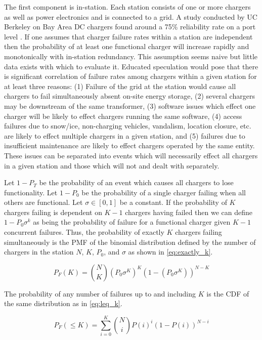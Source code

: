 \documentclass[11pt]{article}
\begin{document}
The first component is in-station. Each station consists of one or more chargers as well as power electronics and is connected to a grid. A study conducted by UC Berkeley on Bay Area DC chargers found around a 75\% reliability rate on a port level \cite{Rempel_2023}. If one assumes that charger failure rates within a station are independent then the probability of at least one functional charger will increase rapidly and monotonically with in-station redundancy. This assumption seems naive but little data exists with which to evaluate it. Educated speculation would pose that there is significant correlation of failure rates among chargers within a given station for at least three reasons: (1) Failure of the grid at the station would cause all chargers to fail simultaneously absent on-site energy storage, (2) several chargers may be downstream of the same transformer, (3) software issues which effect one charger will be likely to effect chargers running the same software, (4) access failures due to snow/ice, non-charging vehicles, vandalism, location closure, etc. are likely to effect multiple chargers in a given station, and (5) failures due to insufficient maintenance are likely to effect chargers operated by the same entity. These issues can be separated into events which will necessarily effect all chargers in a given station and those which will not and dealt with separately.

Let $1 - P_T$ be the probability of an event which causes all chargers to lose functionality. Let $1 - P_0$ be the probability of a single charger failing when all others are functional. Let $\sigma \in [0, 1]$ be a constant. If the probability of $K$ chargers failing is dependent on $K - 1$ chargers having failed then we can define $1 - P_0\sigma^k$ as being the probability of failure for a functional charger given $K - 1$ concurrent failures. Thus, the probability of exactly $K$ chargers failing simultaneously is the PMF of the binomial distribution defined by the number of chargers in the station $N$, $K$, $P_0$, and $\sigma$ as shown in \eqref{eq:exactly_k}.

\begin{equation}
	P_F(K) = \binom{N}{K}(P_0\sigma^K)^K(1 - (P_0\sigma^K))^{N-K}\label{eq:exactly_k}
\end{equation}

The probability of any number of failures up to and including $K$ is the CDF of the same distribution as in \eqref{eq:leq_k}.

\begin{equation}
	P_F(\leq K) = \sum_{i=0}^{K}\binom{N}{i}P(i)^i(1 - P(i))^{N-i}\label{eq:leq_k}
\end{equation}
\end{document}
